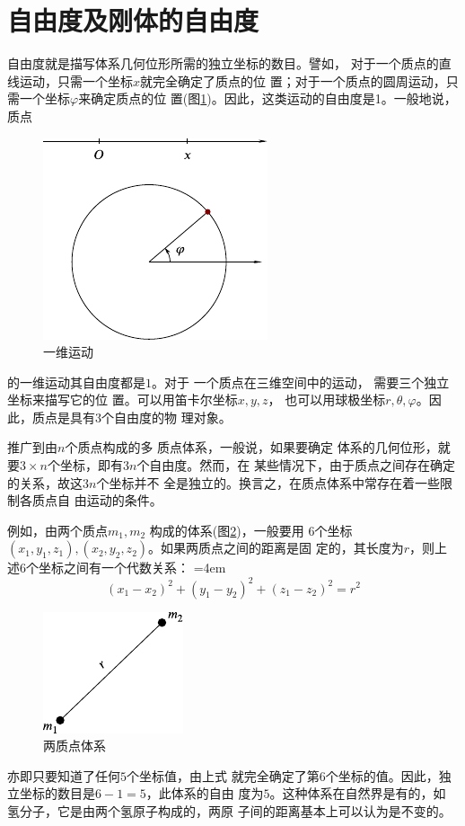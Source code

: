 \section{自由度及刚体的自由度}\label{sec:10.01}

自由度就是描写体系几何位形所需的独立坐标的数目。譬如，
对于一个质点的直线运动，只需一个坐标$ x $就完全确定了质点的位
置；对于一个质点的圆周运动，只需一个坐标$ \varphi $来确定质点的位
置(图\ref{fig:10.01})。因此，这类运动的自由度是1。一般地说，质点
\begin{figure}
  \centering
  \includegraphics{figure/fig10.01}
  \caption{一维运动}
  \label{fig:10.01}
\end{figure}
的一维运动其自由度都是$ 1 $。对于
一个质点在三维空间中的运动，
需要三个独立坐标来描写它的位
置。可以用笛卡尔坐标$ x,y,z $，
也可以用球极坐标$ r, \theta , \varphi $。因
此，质点是具有$ 3 $个自由度的物
理对象。

推广到由$ n $个质点构成的多
质点体系，一般说，如果要确定
体系的几何位形，就要$ 3 \times n $个坐标，即有$ 3n $个自由度。然而，在
某些情况下，由于质点之间存在确定的关系，故这$ 3n $个坐标并不
全是独立的。换言之，在质点体系中常存在着一些限制各质点自
由运动的条件。

例如，由两个质点$ m _ 1, m _ { 2 } $ 构成的体系(图\ref{fig:10.02})，一般要用
$ 6 $个坐标$ \left( x _ { 1 } , y _ { 1 } , z _ { 1 } \right) ,\left(x_2,y_2,z_2\right) $。如果两质点之间的距离是固
定的，其长度为$ r $，则上述$ 6 $个坐标之间有一个代数关系：
\begingroup
\mathindent=4em
\begin{equation}\label{eqn:10.01.01}
  \left( x _ { 1 } - x _ { 2 } \right) ^ { 2 } + \left( y _ { 1 } - y _ { 2 } \right) ^ { 2 } + \left( z _ { 1 } - z _ { 2 } \right) ^ { 2 } = r ^ { 2 }
\end{equation}
\endgroup
\begin{figure}
  \centering
  \includegraphics{figure/fig10.02}
  \caption{两质点体系}
  \label{fig:10.02}
\end{figure}
亦即只要知道了任何$ 5 $个坐标值，由上式
就完全确定了第$ 6 $个坐标的值。因此，独
立坐标的数目是$ 6-1=5 $，此体系的自由
度为$ 5 $。这种体系在自然界是有的，如
氢分子，它是由两个氢原子构成的，两原
子间的距离基本上可以认为是不变的。

